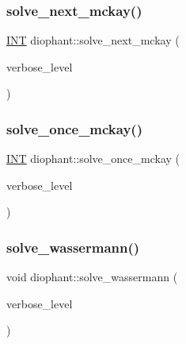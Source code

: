 \mbox{\label{classdiophant_a0a65850def82535e99895c1b69dc282e}} 
\subsubsection{\texorpdfstring{solve\+\_\+next\+\_\+mckay()}{solve\_next\_mckay()}}
{\footnotesize\ttfamily \mbox{\hyperlink{galois_8h_a09fddde158a3a20bd2dcadb609de11dc}{I\+NT}} diophant\+::solve\+\_\+next\+\_\+mckay (\begin{DoxyParamCaption}\item[{\mbox{\hyperlink{galois_8h_a09fddde158a3a20bd2dcadb609de11dc}{I\+NT}}}]{verbose\+\_\+level }\end{DoxyParamCaption})}

\mbox{\label{classdiophant_a8d8ba624243d2d47ecd5f6834a259c48}} 
\subsubsection{\texorpdfstring{solve\+\_\+once\+\_\+mckay()}{solve\_once\_mckay()}}
{\footnotesize\ttfamily \mbox{\hyperlink{galois_8h_a09fddde158a3a20bd2dcadb609de11dc}{I\+NT}} diophant\+::solve\+\_\+once\+\_\+mckay (\begin{DoxyParamCaption}\item[{\mbox{\hyperlink{galois_8h_a09fddde158a3a20bd2dcadb609de11dc}{I\+NT}}}]{verbose\+\_\+level }\end{DoxyParamCaption})}

\mbox{\label{classdiophant_adee01f76037d0570155f46989b57065c}} 
\subsubsection{\texorpdfstring{solve\+\_\+wassermann()}{solve\_wassermann()}}
{\footnotesize\ttfamily void diophant\+::solve\+\_\+wassermann (\begin{DoxyParamCaption}\item[{\mbox{\hyperlink{galois_8h_a09fddde158a3a20bd2dcadb609de11dc}{I\+NT}}}]{verbose\+\_\+level }\end{DoxyParamCaption})}

